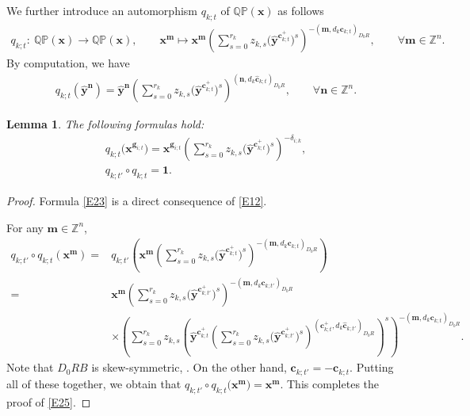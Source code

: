 \documentclass[pdftex]{sigma}
\newcommand{\id}{\mathbf{1}}
\numberwithin{equation}{section}
\newtheorem{Lemma}[Theorem]{Lemma}
\begin{document}
We further introduce an automorphism $q_{k;t}$ of $\mathbb{QP}(\mathbf{x})$ as follows
\begin{align*}
 q_{k;t}\colon\
 \mathbb{QP}(\mathbf{x})\longrightarrow\mathbb{QP}(\mathbf{x}),\qquad
 \mathbf{x}^{\mathbf{m}}\longmapsto\mathbf{x}^{\mathbf{m}}\left(\sum\limits_{s=0}^{r_k}z_{k,s}\bigl(\hat{\mathbf{y}}^{\mathbf{c}_{k;t}^+}\bigr)^s\right)^{-(\mathbf{m},d_{k}\mathbf{c}_{k;t})_{D_0R}},\qquad \forall \mathbf{m} \in\mathbb{Z}^n.
\end{align*}
By computation, we have
\begin{align}
 q_{k;t}(\hat{\mathbf{y}}^{\mathbf{n}})=\hat{\mathbf{y}}^{\mathbf{n}}
 \left(\sum\limits_{s=0}^{r_k}z_{k,s}\bigl(\hat{\mathbf{y}}^{\mathbf{c}_{k;t}^+}\bigr)^s\right)^{(\mathbf{n},d_{k}\mathbf{\hat{c}}_{k;t})_{D_0R}},\qquad \forall \mathbf{n}\in\mathbb{Z}^n.\label{E22}
\end{align}
\begin{Lemma}\label{P10}
The following formulas hold:
 \begin{gather}
  q_{k;t}\bigl(\mathbf{x}^{\mathbf{g}_{i;t}}\bigr)=\mathbf{x}^{\mathbf{g}_{i;t}}\left(\sum\limits_{s=0}^{r_k}z_{k,s}\bigl(\hat{\mathbf{y}}^{\mathbf{c}_{k;t}^+}\bigr)^s\right)^{-\delta_{i;k}},\label{E23}\\
  q_{k;t'}\circ q_{k;t}=\id. \label{E25}
 \end{gather}
\end{Lemma}
\begin{proof}
Formula \eqref{E23} is a direct consequence of \eqref{E12}.


 For any $\mathbf{m}\in\mathbb{Z}^n$,
 \begin{align*}
 q_{k;t'}\circ q_{k;t}(\mathbf{x}^{\mathbf{m}})={}&q_{k;t'}
 \left(\mathbf{x}^{\mathbf{m}}\left(\sum\limits_{s=0}^{r_k}z_{k,s}\bigl(\hat{\mathbf{y}}^{\mathbf{c}_{k;t}^+}\bigr)^s\right)^{-(\mathbf{m},d_{k}\mathbf{c}_{k;t})_{D_0R}}\right)\\
 ={}&\mathbf{x}^{\mathbf{m}}\left(\sum\limits_{s=0}^{r_k}z_{k,s}\bigl(\hat{\mathbf{y}}^{\mathbf{c}_{k;t'}^+}\bigr)^s\right)^{-(\mathbf{m},d_{k}\mathbf{c}_{k;t'})_{D_0R}}\\
 &\times\left(\sum\limits_{s=0}^{r_k}z_{k,s}\left(\hat{\mathbf{y}}^{\mathbf{c}_{k;t}^+}
 \left(\sum\limits_{s=0}^{r_k}z_{k,s}\bigl(\hat{\mathbf{y}}^{\mathbf{c}_{k;t'}^+}\bigr)^s\right)^{(\mathbf{c}_{k;t}^+,d_k\mathbf{\hat{c}}_{k;t'})_{D_0R}}\right)^s\right)^{-(\mathbf{m},d_k\mathbf{c}_{k;t})_{D_0R}}.
 \end{align*}
 Note that $D_0RB$ is skew-symmetric, . On the other hand, $\mathbf{c}_{k;t'}=-\mathbf{c}_{k;t}$. Putting all of these together, we obtain that
 $
 q_{k;t'}\circ q_{k;t}\bigl(\mathbf{x}^\mathbf{m}\bigr)=\mathbf{x}^\mathbf{m}$.
 This completes the proof of \eqref{E25}.
\end{proof}
\end{document}
